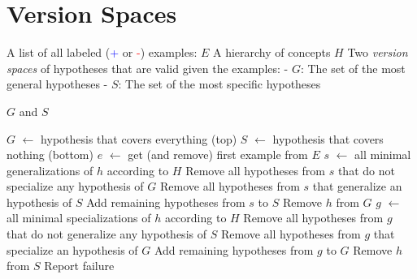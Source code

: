 \documentclass[alternative-exam.tex]{subfiles}
\newcommand{\algorithmicinput}{\textbf{Input:}}
\newcommand{\algorithmicoutput}{\textbf{Output:}}
\newcommand{\INPUT}{\item[\algorithmicinput]}
\newcommand{\OUTPUT}{\item[\algorithmicoutput]}
\newcommand{\algorithmicalgo}{\textbf{Algorithm:}}
\newcommand{\ALGO}{\item[\algorithmicalgo]}
\begin{document}
\section{Version Spaces}
\begin{algorithmic}
\label{versionspaces}
\INPUT
\STATE A list of all labeled (\textcolor{blue}{+} or \textcolor{red}{-}) examples: $E$
\STATE A hierarchy of concepts $H$
\STATE Two \emph{version spaces} of hypotheses that are valid given the examples:
\STATE \hspace{0.3cm} - $G$: The set of the most general hypotheses
\STATE \hspace{0.3cm} - $S$: The set of the most specific hypotheses

\OUTPUT
\STATE $G$ and $S$
\end{algorithmic}
\begin{algorithmic}
\ALGO
\STATE $G$ $\leftarrow$ {hypothesis that covers everything (top)}
\STATE $S$ $\leftarrow$ {hypothesis that covers nothing (bottom)}
\STATE $e$ $\leftarrow$ get (and remove) first example from $E$
\STATE $s$ $\leftarrow$ all minimal generalizations of $h$ according to $H$
\STATE Remove all hypotheses from $s$ that do not specialize any hypothesis of $G$
\STATE Remove all hypotheses from $s$ that generalize an hypothesis of $S$
\STATE Add remaining hypotheses from $s$ to $S$
\ENDFOR
{}
\STATE Remove $h$ from $G$
\ENDFOR
\ENDIF
{}
\STATE $g$ $\leftarrow$ all minimal specializations of $h$ according to $H$
\STATE Remove all hypotheses from $g$ that do not generalize any hypothesis of $S$
\STATE Remove all hypotheses from $g$ that specialize an hypothesis of $G$
\STATE Add remaining hypotheses from $g$ to $G$
\ENDFOR
{}
\STATE Remove $h$ from $S$
\ENDFOR
\ENDIF
{}
\STATE Report failure
\ENDIF
\ENDWHILE
\end{algorithmic}
\pagebreak
\end{document}
